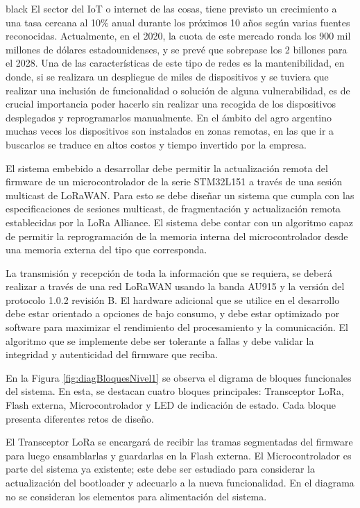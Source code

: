 \documentclass[11pt]{charter}
\begin{document}
\begin{consigna}{black}
El sector del IoT o internet de las cosas, tiene previsto un crecimiento a una tasa cercana
al 10\% anual durante los próximos 10 años según varias fuentes reconocidas.
Actualmente, en el 2020, la cuota de este mercado ronda los 900 mil millones de dólares
estadounidenses, y se prevé que sobrepase los 2 billones para el 2028. Una de las
características de este tipo de redes es la mantenibilidad, en donde, si se realizara un
despliegue de miles de dispositivos y se tuviera que realizar una inclusión de
funcionalidad o solución de alguna vulnerabilidad, es de crucial importancia poder hacerlo
sin realizar una recogida de los dispositivos desplegados y reprogramarlos manualmente.
En el ámbito del agro argentino muchas veces los dispositivos son instalados en zonas
remotas, en las que ir a buscarlos se traduce en altos costos y tiempo invertido por la
empresa.

El sistema embebido a desarrollar debe permitir la actualización remota del firmware de
un microcontrolador de la serie STM32L151 a través de una sesión multicast de
LoRaWAN. Para esto se debe diseñar un sistema que cumpla con las especificaciones de
sesiones multicast, de fragmentación y actualización remota establecidas por la LoRa
Alliance\textregistered. El sistema debe contar con un algoritmo capaz de permitir la reprogramación de la memoria interna del microcontrolador desde una memoria externa del tipo que
corresponda.

La transmisión y recepción de toda la información que se requiera, se deberá realizar a
través de una red LoRaWAN usando la banda AU915 y la versión del protocolo 1.0.2
revisión B. El hardware adicional que se utilice en el desarrollo debe estar orientado a
opciones de bajo consumo, y debe estar optimizado por software para maximizar el
rendimiento del procesamiento y la comunicación. El algoritmo que se implemente debe
ser tolerante a fallas y debe validar la integridad y autenticidad del firmware que reciba.

En la Figura \ref{fig:diagBloquesNivel1} se observa el digrama de bloques funcionales del sistema. En esta, se destacan cuatro bloques principales: Transceptor LoRa, Flash externa, Microcontrolador y LED de indicación de estado. Cada bloque presenta diferentes retos de diseño.

El Transceptor LoRa se encargará de recibir las tramas segmentadas del firmware para luego ensamblarlas y guardarlas en la Flash externa. El Microcontrolador es parte del sistema ya existente; este debe ser estudiado para considerar la actualización del bootloader y adecuarlo a la nueva funcionalidad. En el diagrama no se consideran los elementos para alimentación del sistema.


\end{consigna}
\end{document}
